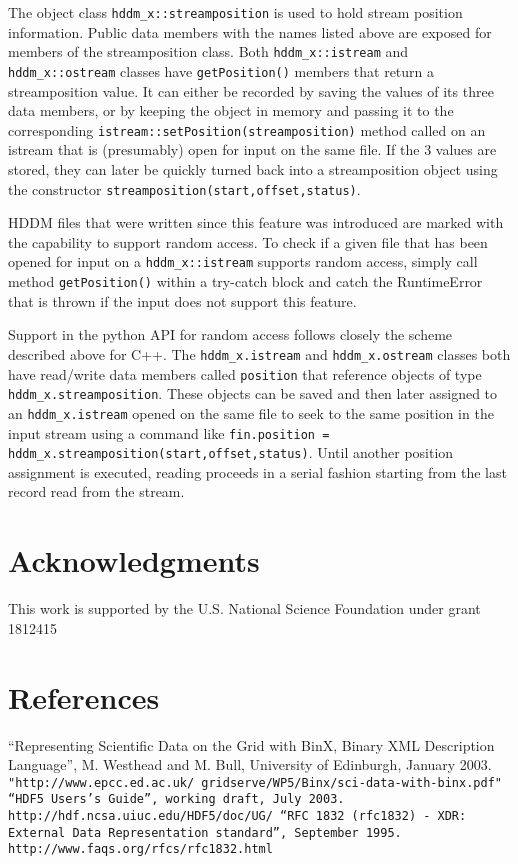 \documentclass{revtex4}
\begin{document}
The object class \texttt{hddm\_x::streamposition} is used to hold stream
position information. Public data members with the names listed above are
exposed for members of the streamposition class. Both \texttt{hddm\_x::istream}
and \texttt{hddm\_x::ostream} classes have \texttt{getPosition()} members that
return a streamposition value. It can either be recorded by saving the values
of its three data members, or by keeping the object in memory and passing it
to the corresponding \texttt{istream::setPosition(streamposition)} method
called on an istream that is (presumably) open for input on the same file.
If the 3 values are stored, they can later be quickly turned back into a
streamposition object using the constructor 
\texttt{streamposition(start,offset,status)}.

HDDM files that were written since this feature was introduced are marked
with the capability to support random access. To check if a given file that
has been opened for input on a \texttt{hddm\_x::istream} supports random access,
simply call method \texttt{getPosition()} within a try-{}catch block and catch
the RuntimeError that is thrown if the input does not support this feature.

Support in the python API for random access follows closely the scheme
described above for C++. The \texttt{hddm\_x.istream} and 
\texttt{hddm\_x.ostream} classes both have read/write data members called
\texttt{position} that reference objects of type \texttt{hddm\_x.streamposition}.
These objects can be saved and then later assigned to an
\texttt{hddm\_x.istream} opened on the same file to seek to the same position
in the input stream using a command like
\texttt{fin.position = hddm\_x.streamposition(start,offset,status)}. Until
another position assignment is executed, reading proceeds in a serial
fashion starting from the last record read from the stream.

\section{Acknowledgments}

This work is supported by the U.S. National Science Foundation under grant 1812415

\section{References}
\begin{thebibliography}{d}
``Representing Scientific Data on the Grid with BinX, Binary XML Description
Language'', M. Westhead and M. Bull, University of Edinburgh, January 2003.
\tt{"http://www.epcc.ed.ac.uk/~gridserve/WP5/Binx/sci-data-with-binx.pdf"}
``HDF5 Users's Guide'', working draft, July 2003.
\tt{http://hdf.ncsa.uiuc.edu/HDF5/doc/UG/}
``RFC 1832 (rfc1832) - XDR: External Data Representation standard'',
September 1995.
\tt{http://www.faqs.org/rfcs/rfc1832.html}
\end{thebibliography}
\end{document}
